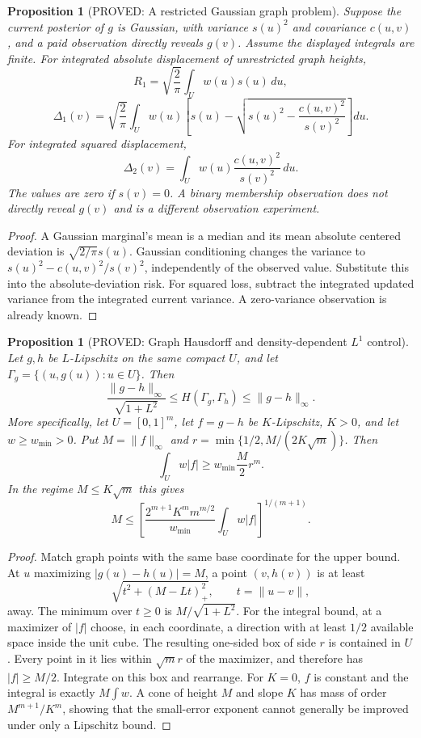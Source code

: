 \documentclass[11pt]{article}
\newtheorem{proposition}[theorem]{Proposition}
\theoremstyle{definition}
\theoremstyle{remark}
\begin{document}
\begin{proposition}[PROVED: A restricted Gaussian graph problem]
\label{rthreegeo:gaussiangraph}
Suppose the current posterior of $g$ is Gaussian, with variance $s(u)^2$
and covariance $c(u,v)$, and a paid observation directly reveals $g(v)$.
Assume the displayed integrals are finite. For integrated absolute
displacement of unrestricted graph heights,
\[
 R_1=\sqrt{\frac2\pi}\int_U w(u)s(u)\,du,
\]
\[
 \Delta_1(v)=\sqrt{\frac2\pi}\int_Uw(u)
 \left[s(u)-\sqrt{s(u)^2-\frac{c(u,v)^2}{s(v)^2}}\right]du.
\]
For integrated squared displacement,
\[
 \Delta_2(v)=\int_Uw(u)\frac{c(u,v)^2}{s(v)^2}\,du.
\]
The values are zero if $s(v)=0$. A binary membership observation does not
directly reveal $g(v)$ and is a different observation experiment.
\end{proposition}
\begin{proof}
A Gaussian marginal's mean is a median and its mean absolute centered
deviation is $\sqrt{2/\pi}s(u)$. Gaussian conditioning changes the variance
to $s(u)^2-c(u,v)^2/s(v)^2$, independently of the observed value.
Substitute this into the absolute-deviation risk. For squared loss,
subtract the integrated updated variance from the integrated current
variance. A zero-variance observation is already known.
\end{proof}

\begin{proposition}[PROVED: Graph Hausdorff and density-dependent $L^1$ control]
\label{rthreegeo:holderbridge}
Let $g,h$ be $L$-Lipschitz on the same compact $U$, and let
$\Gamma_g=\{(u,g(u)):u\in U\}$. Then
\[
 \frac{\|g-h\|_\infty}{\sqrt{1+L^2}}
 \le H(\Gamma_g,\Gamma_h)\le\|g-h\|_\infty.
\]
More specifically, let $U=[0,1]^m$, let $f=g-h$ be $K$-Lipschitz,
$K>0$, and let $w\ge w_{\min}>0$. Put $M=\|f\|_\infty$ and
$r=\min\{1/2,M/(2K\sqrt m)\}$. Then
\[
 \int_Uw|f|\ge w_{\min}\frac M2 r^m.
\]
In the regime $M\le K\sqrt m$ this gives
\[
 M\le\left[
 \frac{2^{m+1}K^m m^{m/2}}{w_{\min}}\int_Uw|f|
 \right]^{1/(m+1)}.
\]
\end{proposition}
\begin{proof}
Match graph points with the same base coordinate for the upper bound.
At $u$ maximizing $|g(u)-h(u)|=M$, a point $(v,h(v))$ is at least
\[
 \sqrt{t^2+(M-Lt)_+^2},\qquad t=\|u-v\|,
\]
away. The minimum over $t\ge0$ is $M/\sqrt{1+L^2}$.
For the integral bound, at a maximizer of $|f|$ choose, in each coordinate,
a direction with at least $1/2$ available space inside the unit cube.
The resulting one-sided box of side $r$ is contained in $U$. Every point
in it lies within $\sqrt m r$ of the maximizer, and therefore has
$|f|\ge M/2$. Integrate on this box and rearrange. For $K=0$, $f$ is
constant and the integral is exactly $M\int w$. A cone of height $M$
and slope $K$ has mass of order $M^{m+1}/K^m$, showing that the
small-error exponent cannot generally be improved under only a
Lipschitz bound.
\end{proof}
\end{document}
